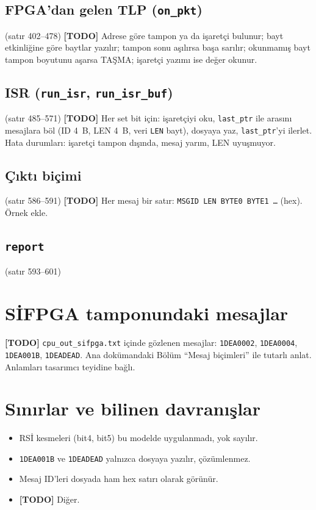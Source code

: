\documentclass[11pt,a4paper]{article}
\newcommand{\kod}[1]{\texttt{#1}}
\newcommand{\todo}[1]{\textcolor{red!60!black}{\textbf{[TODO]} #1}}
\newcommand{\satir}[1]{\textcolor{black!60}{\scriptsize(satır #1)}}
\begin{document}
\subsection{FPGA'dan gelen TLP (\kod{on\_pkt})}
\satir{402--478}
\todo{Adrese göre tampon ya da işaretçi bulunur; bayt etkinliğine göre baytlar
yazılır; tampon sonu aşılırsa başa sarılır; okunmamış bayt tampon boyutunu aşarsa
TAŞMA; işaretçi yazımı ise değer okunur.}

\subsection{ISR (\kod{run\_isr}, \kod{run\_isr\_buf})}
\satir{485--571}
\todo{Her set bit için: işaretçiyi oku, \kod{last\_ptr} ile arasını mesajlara böl
(ID 4~B, LEN 4~B, veri \kod{LEN} bayt), dosyaya yaz, \kod{last\_ptr}'yi ilerlet.
Hata durumları: işaretçi tampon dışında, mesaj yarım, LEN uyuşmuyor.}

\subsection{Çıktı biçimi}
\satir{586--591}
\todo{Her mesaj bir satır: \kod{MSGID LEN BYTE0 BYTE1 \ldots} (hex). Örnek ekle.}

\subsection{\kod{report}}
\satir{593--601}

\section{SİFPGA tamponundaki mesajlar}

\todo{\kod{cpu\_out\_sifpga.txt} içinde gözlenen mesajlar: \kod{1DEA0002},
\kod{1DEA0004}, \kod{1DEA001B}, \kod{1DEADEAD}. Ana dokümandaki Bölüm
``Mesaj biçimleri'' ile tutarlı anlat. Anlamları tasarımcı teyidine bağlı.}

\section{Sınırlar ve bilinen davranışlar}

\begin{itemize}[nosep]
  \item RSİ kesmeleri (bit4, bit5) bu modelde uygulanmadı, yok sayılır.
  \item \kod{1DEA001B} ve \kod{1DEADEAD} yalnızca dosyaya yazılır, çözümlenmez.
  \item Mesaj ID'leri dosyada ham hex satırı olarak görünür.
  \item \todo{Diğer.}
\end{itemize}
\end{document}
